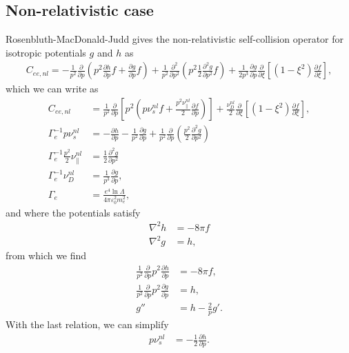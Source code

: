 \documentclass[11pt,a4paper]{article}
\begin{document}
\subsection{Non-relativistic case}
Rosenbluth-MacDonald-Judd gives the non-relativistic self-collision operator for isotropic potentials $g$ and $h$ as
\begin{align}
C_{ee,nl} =  -\frac{1}{p^2}\frac{\partial}{\partial p}\left(p^2\frac{\partial h}{\partial p}f+\frac{\partial g}{\partial p}f\right) + \frac{1}{p^2}\frac{\partial^2}{\partial p^2} \left(p^2\frac{1}{2}\frac{\partial^2 g}{\partial p^2} f\right) +\frac{1}{2p^3}\frac{\partial g}{\partial p}\frac{\partial}{\partial \xi}\left[(1-\xi^2)\frac{\partial f}{\partial \xi}\right],
\end{align}
which we can write as
\begin{align}
C_{ee,nl} &= \frac{1}{p^2}\frac{\partial}{\partial p}\left[p^2\left( p\nu_s^{nl} f+ \frac{p^2\nu_\parallel^{nl}}{2}\frac{\partial f}{\partial p}\right)\right] + \frac{\nu_D^{nl}}{2}\frac{\partial}{\partial \xi}\left[(1-\xi^2)\frac{\partial f}{\partial\xi}\right], \\
\Gamma_e^{-1}p\nu_s^{nl} &= -\frac{\partial h}{\partial p} - \frac{1}{p^2}\frac{\partial g}{\partial p} +\frac{1}{p^2}\frac{\partial}{\partial p}\left(\frac{p^2}{2}\frac{\partial^2 g}{\partial p^2}\right) \nonumber \\
\Gamma_e^{-1}\frac{p^2}{2}\nu_\parallel^{nl} &= \frac{1}{2}\frac{\partial^2 g}{\partial p^2} \nonumber\\
\Gamma_e^{-1}\nu_D^{nl} &= \frac{1}{p^3}\frac{\partial g}{\partial p}  \nonumber, \\
\Gamma_e &= \frac{e^4 \ln\Lambda}{4\pi\varepsilon_0^2 m_e^2}, \nonumber
\end{align}
and where the potentials satisfy
\begin{align}
\nabla^2 h &= -8\pi f \nonumber \\
\nabla^2 g &= h,
\end{align}
from which we find
\begin{align}
\frac{1}{p^2}\frac{\partial}{\partial p}p^2\frac{\partial h}{\partial p} &= -8\pi f, \nonumber \\
\frac{1}{p^2}\frac{\partial}{\partial p}p^2\frac{\partial g}{\partial p} &= h , \nonumber \\
g'' &= h-\frac{2}{p}g'.
\end{align}
With the last relation, we can simplify
\begin{align}
p\nu_s^{nl} &=  -\frac{1}{2}\frac{\partial h}{\partial p}. %
\end{align}
\end{document}
